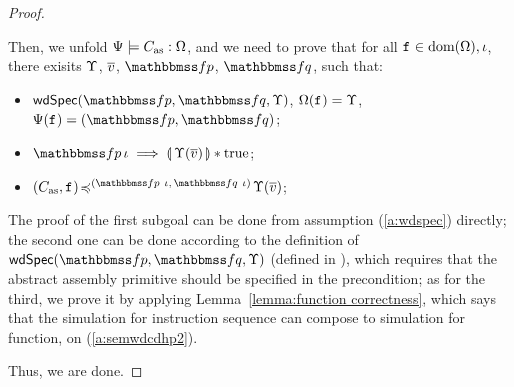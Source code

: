 \begin{proof}
\begin{itemize}
            Then, we unfold ${\Psi} \models {C_{\text{as}}} : {\Omega}$, 
            and we need to prove that for all $\texttt{f}_{} \in \text{dom}(\Omega), 
            \iota$, there exisits $\Upsilon$, $\overline{v}$, 
            $\relspecpre$, $\relspecpost$, such that: 
            \begin{itemize}
                \small
                \item $\wdSpec{\relspecpre}{\relspecpost}{\hprim}$, 
                    $\Omega(\texttt{f}_{}) = \Upsilon$, 
                    $\Cspec(\lab{}) = (\relspecpre, \relspecpost)$;
                \item $\relspecpre \, \lgvl \implies 
                    \safePrimAst{\, \hprim(\args{\val}) \,} 
                    \sepstar \atrue$; 
                \item $\simFunction{(\asmimp, \lab{})}
                    {(\relspecpre \ \lgvl, \,\relspecpost \ \lgvl)}
                    {\hprim(\args{\val})}$; 
            \end{itemize}
            The proof of the first subgoal can be done from 
            assumption (\ref{a:wdspec}) directly; the second 
            one can be done according to the definition of 
            $\wdSpec{\relspecpre}{\relspecpost}{\hprim}$
            (defined in \Def{\ref{def:well-defined specification}}), 
            which requires that the abstract assembly primitive should 
            be specified in the precondition; as for the 
            third, we prove it by applying 
            Lemma~\ref{lemma:function correctness}, which 
            says that the simulation for instruction sequence 
            can compose to simulation for function, on 
            (\ref{a:semwdcdhp2}). 
    \end{itemize}
    Thus, we are done.
\end{proof}


